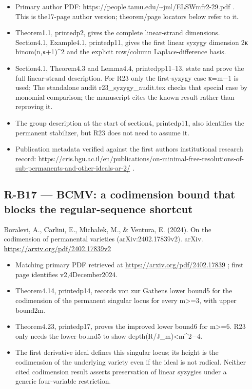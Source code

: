 \documentclass[11pt,a4paper]{article}
\providecommand{\tightlist}{\setlength{\itemsep}{0pt}\setlength{\parskip}{0pt}}
\theoremstyle{definition}\newtheorem{definition}{Definition}
\begin{document}
\begin{itemize}
\tightlist
\item
  Primary author PDF: \url{https://people.tamu.edu/~jml/ELSWmfr2-29.pdf}
  . This is the17-page author version; theorem/page locators below refer
  to it.
\item
  Theorem1.1, printedp2, gives the complete linear-strand dimensions.
  Section4.1, Example4.1, printedp11, gives the first linear syzygy
  dimension 2κ binom(n,κ+1)\^{}2 and the explicit row/column
  Laplace-difference basis.
\item
  Section4.1, Theorem4.3 and Lemma4.4, printedpp11--13, state and prove
  the full linear-strand description. For R23 only the first-syzygy case
  κ=m−1 is used; The standalone audit r23\_syzygy\_audit.tex checks that
  special case by monomial comparison; the manuscript cites the known
  result rather than reproving it.
\item
  The group description at the start of section4, printedp11, also
  identifies the permanent stabilizer, but R23 does not need to assume
  it.
\item
  Publication metadata verified against the first
  author\textquotesingle s institutional research record:
  \url{https://cris.bgu.ac.il/en/publications/on-minimal-free-resolutions-of-sub-permanents-and-other-ideals-ar-2/}
  .
\end{itemize}

\subsection{R-B17 --- BCMV: a codimension bound that blocks the
regular-sequence
shortcut}\label{r-b17--bcmv-a-codimension-bound-that-blocks-the-regular-sequence-shortcut}

Boralevi, A., Carlini, E., Michałek, M., \& Ventura, E. (2024). On the
codimension of permanental varieties (arXiv:2402.17839v2). arXiv.
\url{https://arxiv.org/pdf/2402.17839v2}

\begin{itemize}
\tightlist
\item
  Matching primary PDF retrieved at
  \url{https://arxiv.org/pdf/2402.17839} ; first page identifies
  v2,4December2024.
\item
  Theorem4.14, printedp14, records von zur Gathen\textquotesingle s
  lower bound5 for the codimension of the permanent singular locus for
  every m\textgreater=3, with upper bound2m.
\item
  Theorem4.23, printedp17, proves the improved lower bound6 for
  m\textgreater=6. R23 only needs the lower bound5 to show
  depth(R/J\_m)\textless m\^{}2−4.
\item
  The first derivative ideal defines this singular locus; its height is
  the codimension of the underlying variety even if the ideal is not
  radical. Neither cited codimension result asserts preservation of
  linear syzygies under a generic four-variable restriction.
\end{itemize}
\end{document}
